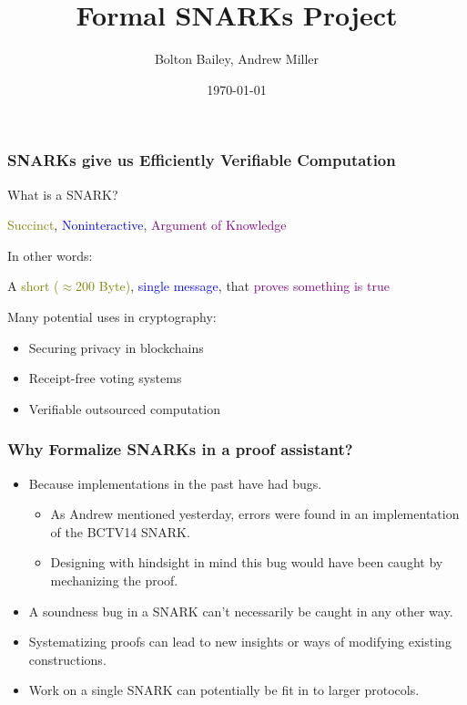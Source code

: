 \documentclass{beamer}
\title[Formal SNARKs Project]{Formal SNARKs Project} %
\author{Bolton Bailey, Andrew Miller} %
\institute[UIUC] %
{
University of Illinois Urbana-Champaign \\ %
\medskip
\textit{boltonb2@illinois.edu} %
}
\date{\today} %
\begin{document}
\begin{frame}
\titlepage %
\end{frame}



\begin{frame}

    \frametitle{SNARKs give us Efficiently Verifiable Computation}

    What is a SNARK?
    \begin{center}
        \textcolor{olive}{Succinct}, \textcolor{blue}{Noninteractive}, \textcolor{purple}{Argument of Knowledge}       
    \end{center}

    In other words:

    \begin{center}
        A \textcolor{olive}{short ($\approx$200 Byte)}, \textcolor{blue}{single message}, that \textcolor{purple}{proves something is true}        
    \end{center}

    Many potential uses in cryptography:

    \begin{itemize}
        \item Securing privacy in blockchains
        \item Receipt-free voting systems
        \item Verifiable outsourced computation 
    \end{itemize}    


\end{frame}


\begin{frame}
    \frametitle{Why Formalize SNARKs in a proof assistant?}
    
    \begin{itemize}
        \item Because implementations in the past have had bugs.
        \begin{itemize}
            \item As Andrew mentioned yesterday, errors were found in an  implementation of the BCTV14 SNARK.
            \item Designing with hindsight in mind this bug would have been caught by mechanizing the proof.
        \end{itemize}
        \item A soundness bug in a SNARK can't necessarily be caught in any other way.
        \item Systematizing proofs can lead to new insights or ways of modifying existing constructions.
        \item Work on a single SNARK can potentially be fit in to larger protocols.
    \end{itemize}

\end{frame}
\end{document}
